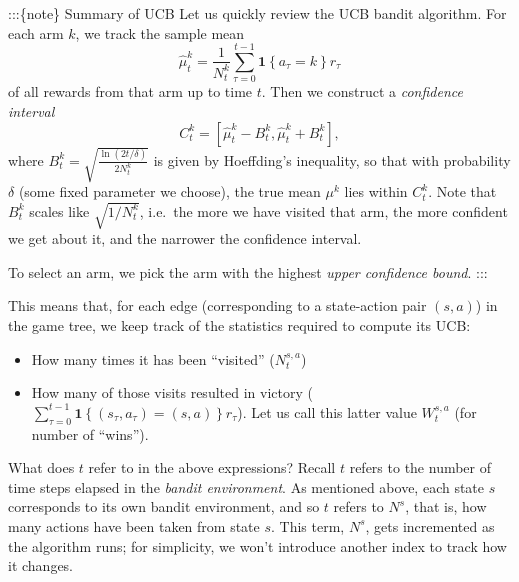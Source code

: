 \documentclass[
  letterpaper,
  DIV=11,
  numbers=noendperiod]{scrreprt}
\providecommand{\tightlist}{%
  \setlength{\itemsep}{0pt}\setlength{\parskip}{0pt}}\usepackage{longtable,booktabs,array}
\theoremstyle{plain}
\theoremstyle{plain}
\theoremstyle{definition}
\theoremstyle{definition}
\theoremstyle{remark}
\begin{document}
:::\{note\} Summary of UCB Let us quickly review the UCB bandit
algorithm. For each arm \(k\), we track the sample mean
\[\hat \mu^k_t = \frac{1}{N_t^k} \sum_{\tau=0}^{t-1} \mathbf{1}\left\{a_\tau = k\right\} r_\tau\]
of all rewards from that arm up to time \(t\). Then we construct a
\emph{confidence interval}
\[C_t^k = [\hat \mu^k_t - B_t^k, \hat \mu^k_t + B_t^k],\] where
\(B_t^k = \sqrt{\frac{\ln(2 t / \delta)}{2 N_t^k}}\) is given by
Hoeffding's inequality, so that with probability \(\delta\) (some fixed
parameter we choose), the true mean \(\mu^k\) lies within \(C_t^k\).
Note that \(B_t^k\) scales like \(\sqrt{1/N^k_t}\), i.e.~the more we
have visited that arm, the more confident we get about it, and the
narrower the confidence interval.

To select an arm, we pick the arm with the highest \emph{upper
confidence bound}. :::

This means that, for each edge (corresponding to a state-action pair
\((s, a)\)) in the game tree, we keep track of the statistics required
to compute its UCB:

\begin{itemize}
\tightlist
\item
  How many times it has been ``visited'' (\(N_t^{s, a}\))
\item
  How many of those visits resulted in victory
  (\(\sum_{\tau=0}^{t-1} \mathbf{1}\left\{(s_\tau, a_\tau) = (s, a)\right\} r_\tau\)).
  Let us call this latter value \(W^{s, a}_t\) (for number of ``wins'').
\end{itemize}

What does \(t\) refer to in the above expressions? Recall \(t\) refers
to the number of time steps elapsed in the \emph{bandit environment}. As
mentioned above, each state \(s\) corresponds to its own bandit
environment, and so \(t\) refers to \(N^s\), that is, how many actions
have been taken from state \(s\). This term, \(N^s\), gets incremented
as the algorithm runs; for simplicity, we won't introduce another index
to track how it changes.
\end{document}
